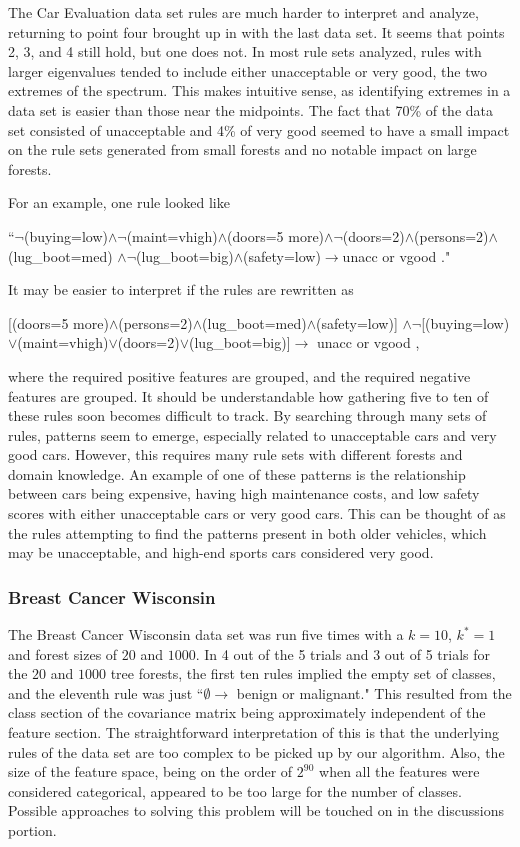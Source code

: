 \documentclass[11pt]{article}
\begin{document}
The Car Evaluation data set rules are much harder to interpret and analyze, returning to point four brought up in with the last data set. It seems that points 2, 3, and 4 still hold, but one does not. In most rule sets analyzed, rules with larger eigenvalues tended to include either unacceptable or very good, the two extremes of the spectrum. This makes intuitive sense, as identifying extremes in a data set is easier than those near the midpoints. The fact that 70\% of the data set consisted of unacceptable and 4\% of very good seemed to have a small impact on the rule sets generated from small forests and no notable impact on large forests. 

For an example, one rule looked like
\begin{center}
``$\neg$(buying=low)$\land \neg$(maint=vhigh)$\land$(doors=5 more)$\land \neg$(doors=2)$\land$(persons=2)$\land$(lug\_boot=med) $\land \neg$(lug\_boot=big)$\land$(safety=low)$\longrightarrow$unacc or vgood  ."
\end{center}
It may be easier to interpret if the rules are rewritten as 
\begin{center}
[(doors=5 more)$\land$(persons=2)$\land$(lug\_boot=med)$\land$(safety=low)] $\land\neg$[(buying=low)$\lor$(maint=vhigh)$\lor$(doors=2)$\lor$(lug\_boot=big)]$\longrightarrow$ unacc or vgood ,
\end{center}
where the required positive features are grouped, and the required negative features are grouped. It should be understandable how gathering five to ten of these rules soon becomes difficult to track. By searching through many sets of rules, patterns seem to emerge, especially related to unacceptable cars and very good cars. However, this requires many rule sets with different forests and domain knowledge. An example of one of these patterns is the relationship between cars being expensive, having high maintenance costs, and low safety scores with either unacceptable cars or very good cars. This can be thought of as the rules attempting to find the patterns present in both older vehicles, which may be unacceptable, and high-end sports cars considered very good.

\subsubsection{Breast Cancer Wisconsin}
The Breast Cancer Wisconsin data set was run five times with a $k=10$, $k^*=1$ and forest sizes of $20$ and $1000$. In 4 out of the 5 trials and 3 out of 5 trials for the $20$ and $1000$ tree forests, the first ten rules implied the empty set of classes, and the eleventh rule was just ``$\emptyset \longrightarrow$ benign or malignant." This resulted from the class section of the covariance matrix being approximately independent of the feature section. The straightforward interpretation of this is that the underlying rules of the data set are too complex to be picked up by our algorithm. Also, the size of the feature space, being on the order of $2^{90}$ when all the features were considered categorical, appeared to be too large for the number of classes. Possible approaches to solving this problem will be touched on in the discussions portion.
\end{document}

